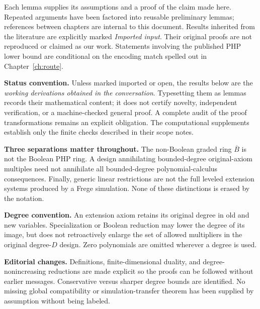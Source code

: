 \documentclass[11pt,oneside]{report}
\theoremstyle{research}
\theoremstyle{definition}
\theoremstyle{remark}
\newcommand{\BB}{\overline B}
\begin{document}
Each lemma supplies its assumptions and a proof of the claim made here. Repeated arguments have been factored into reusable preliminary lemmas; references between chapters are internal to this document. Results inherited from the literature are explicitly marked \emph{Imported input}. Their original proofs are not reproduced or claimed as our work. Statements involving the published PHP lower bound are conditional on the encoding match spelled out in Chapter~\ref{ch:route}.

\textbf{Status convention.} Unless marked imported or open, the results below are the \emph{working derivations obtained in the conversation}. Typesetting them as lemmas records their mathematical content; it does not certify novelty, independent verification, or a machine-checked general proof. A complete audit of the proof transformations remains an explicit obligation. The computational supplements establish only the finite checks described in their scope notes.

\textbf{Three separations matter throughout.} The non-Boolean graded ring $\BB$ is not the Boolean PHP ring. A design annihilating bounded-degree original-axiom multiples need not annihilate all bounded-degree polynomial-calculus consequences. Finally, generic linear restrictions are not the full leveled extension systems produced by a Frege simulation. None of these distinctions is erased by the notation.

\textbf{Degree convention.} An extension axiom retains its original degree in old and new variables. Specialization or Boolean reduction may lower the degree of its image, but does not retroactively enlarge the set of allowed multipliers in the original degree-$D$ design. Zero polynomials are omitted wherever a degree is used.

\textbf{Editorial changes.} Definitions, finite-dimensional duality, and degree-nonincreasing reductions are made explicit so the proofs can be followed without earlier messages. Conservative versus sharper degree bounds are identified. No missing global compatibility or simulation-transfer theorem has been supplied by assumption without being labeled.

\clearpage
\end{document}
